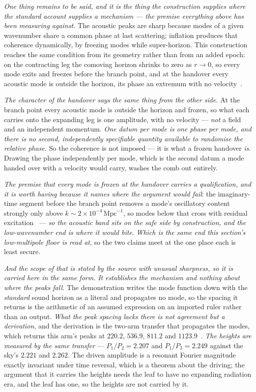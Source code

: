 \documentclass[11pt,a4paper]{article}
\theoremstyle{plain}
\theoremstyle{definition}
\begin{document}
\emph{One thing remains to be said, and it is the thing the construction supplies where the standard account
supplies a mechanism --- the premise everything above has been measuring against.} The acoustic peaks are sharp because modes of a given wavenumber share a common phase at last
scattering; inflation produces that coherence dynamically, by freezing modes while super-horizon. This
construction reaches the same condition from its geometry rather than from an added epoch: on the contracting
leg the comoving horizon shrinks to zero as $r\to0$, so every mode exits and freezes before the branch point,
and at the handover every acoustic mode is outside the horizon, its phase an extremum with no
velocity~\cite{JanzenCRcosmology,JanzenCanonicalTime}. 

\emph{The character of the handover says the same thing from the other side.} At the branch point every
acoustic mode is outside the horizon and frozen, so what each carries onto the expanding leg is one amplitude,
with no velocity --- \emph{not} a field and an independent momentum. \emph{One datum per mode is one phase per
mode, and there is no second, independently specifiable quantity available to randomise the relative phase.}
So the coherence is not imposed --- it is what a frozen handover \emph{is}. Drawing the phase independently per mode,
which is the second datum a mode handed over with a velocity would carry, washes the comb out entirely.

\emph{The premise that every mode is frozen at the handover carries a qualification, and it is worth having because it names where the argument would fail}: the imaginary-time segment before the branch point removes a mode's oscillatory content strongly only above $k\sim2\times10^{-4}\,\mathrm{Mpc}^{-1}$, so modes below that cross with residual excitation~\cite{JanzenCanonicalTime} --- \emph{so the acoustic band sits on the safe side by construction, and the low-wavenumber end is where it would bite}. \emph{Which is the same end this section's low-multipole floor is read at}, so the two claims meet at the one place each is least secure.

\emph{And the scope of that is stated by the source with unusual sharpness, so it is carried here in the same
form.} \emph{It establishes the mechanism and nothing about where the peaks fall.} The demonstration writes
the mode function down with the \emph{standard} sound horizon as a literal and propagates no mode, so the
spacing it returns is the arithmetic of an assumed expression on an imported ruler rather than an
output. \emph{What the peak spacing lacks there is not agreement but a derivation}, and the derivation is the
two-arm transfer that propagates the modes, which returns this arm's peaks at $220.2$, $536.9$, $811.2$ and $1123.9$~\cite{JanzenCRcosmology}. \emph{The heights are measured by the same transfer} --- $P_{1}/P_{2}=2.207$ and $P_{1}/P_{3}=2.249$ against the sky's $2.221$ and $2.262$. The driven amplitude is a resonant Fourier
magnitude exactly invariant under time reversal, which is a theorem about the driving; the argument that
it carries the heights needs the leaf to have no expanding radiation era, and the leaf has one, so the
heights are not carried by it.
\end{document}
